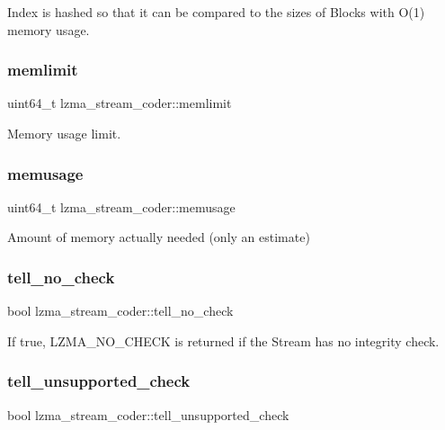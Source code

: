 Index is hashed so that it can be compared to the sizes of Blocks with O(1) memory usage. \mbox{\label{structlzma__stream__coder_ababd0140568f3ff5bb4516356b77ccd3}} 
\subsubsection{memlimit}
{\footnotesize\ttfamily uint64\+\_\+t lzma\+\_\+stream\+\_\+coder\+::memlimit}



Memory usage limit. 

\mbox{\label{structlzma__stream__coder_ae9f09c85f66b5694880fe53fda6f60da}} 
\subsubsection{memusage}
{\footnotesize\ttfamily uint64\+\_\+t lzma\+\_\+stream\+\_\+coder\+::memusage}



Amount of memory actually needed (only an estimate) 

\mbox{\label{structlzma__stream__coder_a39be714b9e7fc874cfc01787c0af579f}} 
\subsubsection{tell\+\_\+no\+\_\+check}
{\footnotesize\ttfamily bool lzma\+\_\+stream\+\_\+coder\+::tell\+\_\+no\+\_\+check}

If true, L\+Z\+M\+A\+\_\+\+N\+O\+\_\+\+C\+H\+E\+CK is returned if the Stream has no integrity check. \mbox{\label{structlzma__stream__coder_a16b8397544a644ab2ec12393704ffbb1}} 
\subsubsection{tell\+\_\+unsupported\+\_\+check}
{\footnotesize\ttfamily bool lzma\+\_\+stream\+\_\+coder\+::tell\+\_\+unsupported\+\_\+check}


